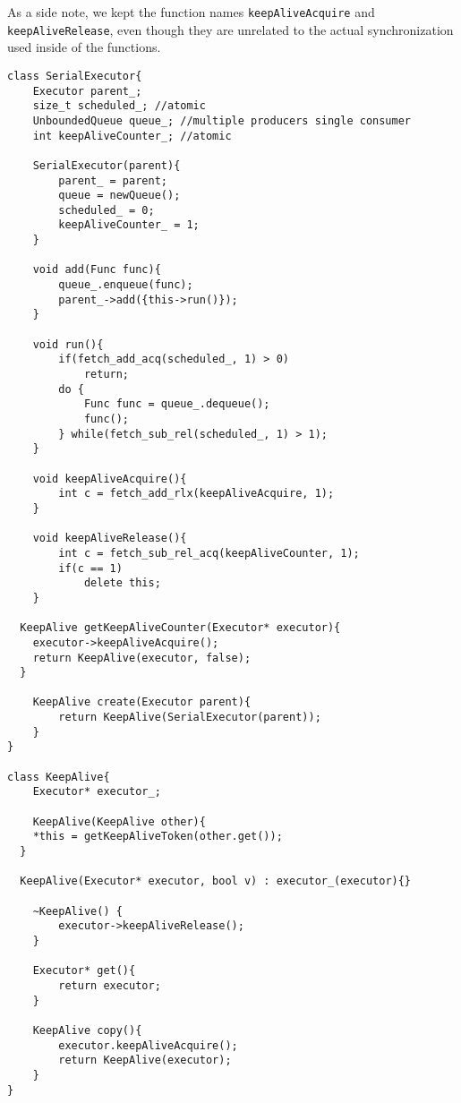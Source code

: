 As a side note, we kept the function names \texttt{keepAliveAcquire} and \texttt{keepAliveRelease}, even though they are unrelated to the actual synchronization used inside of the functions.

\begin{lstlisting}
class SerialExecutor{
	Executor parent_;
	size_t scheduled_; //atomic
	UnboundedQueue queue_; //multiple producers single consumer
	int keepAliveCounter_; //atomic

	SerialExecutor(parent){
		parent_ = parent;
		queue = newQueue();
		scheduled_ = 0;
		keepAliveCounter_ = 1;
	}

	void add(Func func){
		queue_.enqueue(func);
		parent_->add({this->run()});
	}

	void run(){
		if(fetch_add_acq(scheduled_, 1) > 0)
			return;
		do {
			Func func = queue_.dequeue();
			func();
		} while(fetch_sub_rel(scheduled_, 1) > 1);
	}

	void keepAliveAcquire(){
		int c = fetch_add_rlx(keepAliveAcquire, 1);
	}

	void keepAliveRelease(){
		int c = fetch_sub_rel_acq(keepAliveCounter, 1);
		if(c == 1)
			delete this;
	}

  KeepAlive getKeepAliveCounter(Executor* executor){
    executor->keepAliveAcquire();
    return KeepAlive(executor, false);
  }

	KeepAlive create(Executor parent){
		return KeepAlive(SerialExecutor(parent));
	}
}

class KeepAlive{
	Executor* executor_;

	KeepAlive(KeepAlive other){
    *this = getKeepAliveToken(other.get());
  }

  KeepAlive(Executor* executor, bool v) : executor_(executor){}

	~KeepAlive() {
		executor->keepAliveRelease();
	}

	Executor* get(){
		return executor;
	}

	KeepAlive copy(){
		executor.keepAliveAcquire();
		return KeepAlive(executor);
	}
}
\end{lstlisting}
